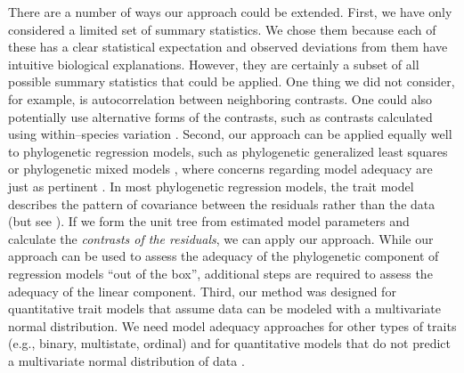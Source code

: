 \documentclass[a4paper,12pt]{article}
\begin{document}
There are a number of ways our approach could be extended. First, we have only considered a limited set of summary statistics. We chose them because each of these has a clear statistical expectation and observed deviations from them have intuitive biological explanations. However, they are certainly a subset of all possible summary statistics that could be applied. One thing we did not consider, for example, is autocorrelation between neighboring contrasts. One could also potentially use alternative forms of the contrasts, such as contrasts calculated using within--species variation \citep{Felsenstein2008}. Second, our approach can be applied equally well to phylogenetic regression models, such as phylogenetic generalized least squares \citep{Grafen1989} or phylogenetic mixed models \citep{Lynch1991, Hadfield2010}, where concerns regarding model adequacy are just as pertinent \citep{Hansen2012}. In most phylogenetic regression models, the trait model describes the pattern of covariance between the residuals rather than the data \citep{Rohlf2001, Rohlf2006} (but see \citep{Hansen2008}). If we form the unit tree from estimated model parameters and calculate the \emph{contrasts of the residuals}, we can apply our approach. While our approach can be used to assess the adequacy of the phylogenetic component of regression models ``out of the box'', additional steps are required to assess the adequacy of the linear component. Third, our method was designed for quantitative trait models that assume data can be modeled with a multivariate normal distribution. We need model adequacy approaches for other types of traits (e.g., binary, multistate, ordinal) and for quantitative models that do not predict a multivariate normal distribution of data \citep{Landis2012}.
\end{document}

